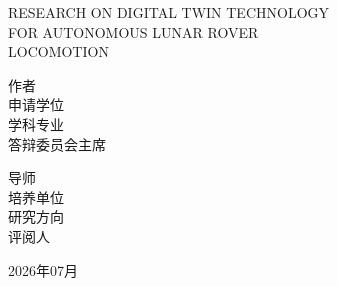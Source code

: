 \vfill

\begin{center}
{ RESEARCH ON DIGITAL TWIN TECHNOLOGY}\\[0.2em]
{ FOR AUTONOMOUS LUNAR ROVER}\\[0.2em]
{ LOCOMOTION}
\end{center}

\vfill

\noindent
\hspace{2cm}%
\begin{minipage}[t]{0.42\textwidth}
{\heiti
    作\qquad 者\underline{\makebox[4cm]{\authorname}}\\[0.8em]
    申请学位\underline{}\\[0.8em]
    学科专业\underline{}\\[0.8em]
    答辩委员会主席\underline{\makebox[2.5cm]{}}}
\end{minipage}%
\hfill
\begin{minipage}[t]{0.45\textwidth}
{\heiti
    导\qquad 师\underline{\makebox[4.5cm]{\supervisor}}\\[0.8em]
    培养单位\underline{}\\[0.8em]
    研究方向 \underline{}\\[0.8em]
    评\quad 阅\quad 人\underline{\makebox[4cm]{}}}
\end{minipage}

\vfill

\begin{center}
{ 2026年07月}
\end{center}

\vspace{0.5cm}

\newpage
